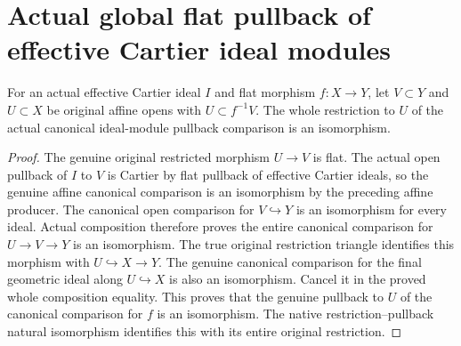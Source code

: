 \section{Actual global flat pullback of effective Cartier ideal modules}
\begin{lemma}
\label{lem:actual-cartier-module-flat-pullback-affine-pair}
\leanok
{}
For an actual effective Cartier ideal $I$ and flat morphism $f:X\to Y$,
let $V\subset Y$ and $U\subset X$ be original affine opens with
$U\subset f^{-1}V$. The whole restriction to $U$ of the actual canonical
ideal-module pullback comparison is an isomorphism.
\end{lemma}
\begin{proof}
The genuine original restricted morphism $U\to V$ is flat. The actual
open pullback of $I$ to $V$ is Cartier by flat pullback of effective Cartier
ideals, so the genuine affine canonical comparison is an isomorphism by
the preceding affine producer. The canonical open comparison for
$V\hookrightarrow Y$ is an isomorphism for every ideal. Actual composition
therefore proves the entire canonical comparison for $U\to V\to Y$ is
an isomorphism. The true original restriction triangle identifies this
morphism with $U\hookrightarrow X\to Y$. The genuine canonical comparison
for the final geometric ideal along $U\hookrightarrow X$ is also an
isomorphism. Cancel it in the proved whole composition equality. This
proves that the genuine pullback to $U$ of the canonical comparison for
$f$ is an isomorphism. The native restriction--pullback natural
isomorphism identifies this with its entire original restriction.
\end{proof}

